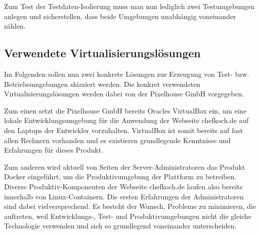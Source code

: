Zum Test der Testdaten-Isolierung muss man nun lediglich zwei Testumgebungen anlegen und sicherstellen, dass beide Umgebungen unabhängig voneinander zählen.

\subsection{Verwendete Virtualisierungslösungen}

Im Folgenden sollen nun zwei konkrete Lösungen zur Erzeugung von Test- bzw. Betriebsumgebungen skizziert werden. Die konkret verwendeten Virtualisierungslösungen werden dabei von der Pixelhouse GmbH vorgegeben.

Zum einen setzt die Pixelhouse GmbH bereits Oracles VirtualBox ein, um eine lokale Entwicklungsumgebung für die Anwendung der Webseite chefkoch.de auf den Laptops der Entwickler vorzuhalten. VirtualBox ist somit bereits auf fast allen Rechnern vorhanden und es existieren grundlegende Kenntnisse und Erfahrungen für dieses Produkt.

Zum anderen wird aktuell von Seiten der Server-Administratoren das Produkt Docker eingeführt, um die Produktivumgebung der Plattform zu betreiben. Diverse Produktiv-Komponenten der Webseite chefkoch.de laufen also bereits innerhalb von Linux-Containern. Die ersten Erfahrungen der Administratoren sind dabei vielversprechend. Es besteht der Wunsch, Probleme zu minimieren, die auftreten, weil Entwicklungs-, Test- und Produktivumgebungen nicht die gleiche Technologie verwenden und sich so grundlegend voneinander unterscheiden.
